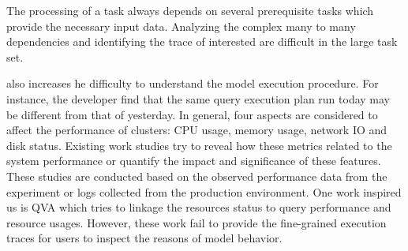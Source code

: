 The processing of a task always depends on several prerequisite tasks which provide the necessary input data. Analyzing the complex many to many dependencies and identifying the trace of interested are difficult in the large task set.

 also increases he difficulty to understand the model execution procedure. For instance, the developer find that the same query execution plan run today may be different from that of yesterday. In general, four aspects are considered to affect the performance of clusters: CPU usage, memory usage, network IO and disk status. Existing work studies try to reveal how these metrics related to the system performance or quantify the impact and significance of these features. These studies are conducted based on the observed performance data from the experiment or logs collected from the production environment. One work inspired us is 
QVA which tries to linkage the resources status to query performance and resource usages. However, these work fail to provide the fine-grained execution traces for users to inspect the reasons of model behavior.

